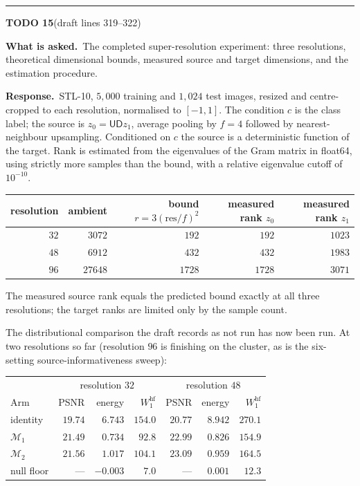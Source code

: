 \documentclass[11pt]{article}
\newcommand{\M}{\mathcal M}
\newenvironment{todoitem}[2]{%
  \par\medskip\noindent\rule{\textwidth}{0.7pt}\par\nobreak\smallskip
  \noindent\textbf{\large TODO #1}\quad\textnormal{\small(draft #2)}\par\nobreak\smallskip
}{\par\medskip}
\newcommand{\ask}[1]{\noindent\textbf{What is asked.}\ #1\par\smallskip}
\newcommand{\resp}[1]{\noindent\textbf{Response.}\ #1\par}
\begin{document}
\begin{todoitem}{15}{lines 319--322}
\ask{The completed super-resolution experiment: three resolutions, theoretical dimensional
bounds, measured source and target dimensions, and the estimation procedure.}

\resp{STL-10, $5{,}000$ training and $1{,}024$ test images, resized and centre-cropped to each
resolution, normalised to $[-1,1]$. The condition $c$ is the class label; the source is
$z_0=\mathsf{UD}z_1$, average pooling by $f=4$ followed by nearest-neighbour upsampling.
Conditioned on $c$ the source is a deterministic function of the target. Rank is estimated from
the eigenvalues of the Gram matrix in float64, using strictly more samples than the bound, with a
relative eigenvalue cutoff of $10^{-10}$.

\begin{center}
\small
\begin{tabular}{@{}rrrrr@{}}
\toprule
resolution & ambient & bound $r=3(\mathrm{res}/f)^2$ & measured rank $z_0$ & measured rank $z_1$\\
\midrule
$32$ & $3072$  & $192$  & $192$  & $1023$\\
$48$ & $6912$  & $432$  & $432$  & $1983$\\
$96$ & $27648$ & $1728$ & $1728$ & $3071$\\
\bottomrule
\end{tabular}
\end{center}

The measured source rank equals the predicted bound exactly at all three resolutions; the target
ranks are limited only by the sample count.

The distributional comparison the draft records as not run has now been run. At two resolutions
so far (resolution $96$ is finishing on the cluster, as is the six-setting source-informativeness
sweep):

\begin{center}
\small
\begin{tabular}{@{}lrrrrrr@{}}
\toprule
& \multicolumn{3}{c}{resolution $32$} & \multicolumn{3}{c}{resolution $48$}\\
Arm & PSNR & energy & $W_1^{\mathrm{hf}}$ & PSNR & energy & $W_1^{\mathrm{hf}}$\\
\midrule
identity & $19.74$ & $6.743$ & $154.0$ & $20.77$ & $8.942$ & $270.1$\\
$\M_1$   & $21.49$ & $0.734$ & $92.8$  & $22.99$ & $0.826$ & $154.9$\\
$\M_2$   & $21.56$ & $1.017$ & $104.1$ & $23.09$ & $0.959$ & $164.5$\\
\midrule
null floor & --- & $-0.003$ & $7.0$ & --- & $0.001$ & $12.3$\\
\bottomrule
\end{tabular}
\end{center}

}
\end{todoitem}
\end{document}
